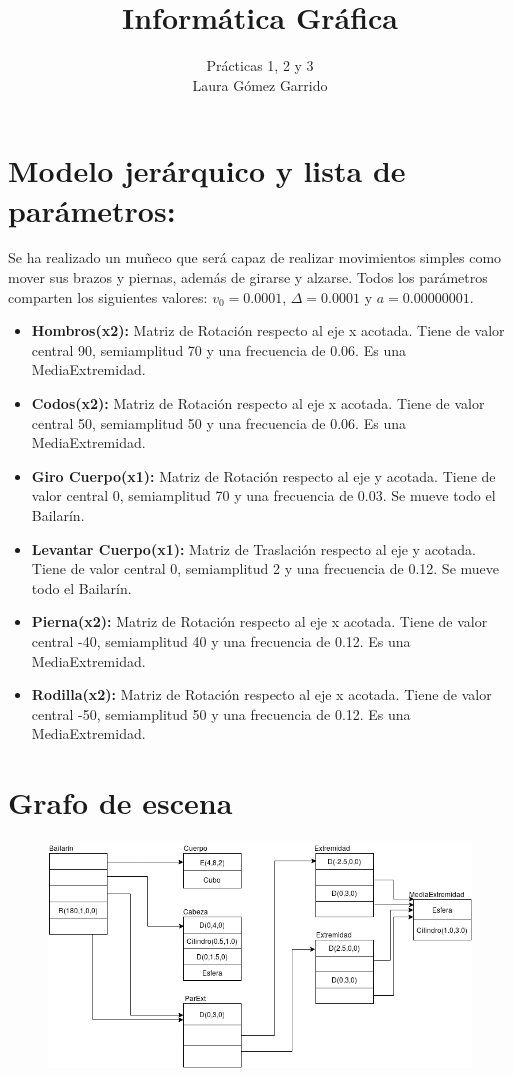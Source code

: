 \documentclass[11pt]{article}
\title{\textbf{Informática Gráfica}}
\author{Prácticas 1, 2 y 3\\
		Laura Gómez Garrido}
\date{}
\begin{document}
\maketitle

\section{Modelo jerárquico y lista de parámetros:}

Se ha realizado un muñeco que será capaz de realizar movimientos simples como mover sus brazos y piernas, además de girarse y alzarse. Todos los parámetros comparten los siguientes valores: $v_0=0.0001$, $\Delta=0.0001$ y $a=0.00000001$.
\begin{itemize}
\item \textbf{Hombros(x2):} Matriz de Rotación respecto al eje x acotada. Tiene de valor central 90, semiamplitud 70 y una frecuencia de 0.06. Es una MediaExtremidad.
\item \textbf{Codos(x2):} Matriz de Rotación respecto al eje x acotada. Tiene de valor central 50, semiamplitud 50 y una frecuencia de 0.06. Es una MediaExtremidad.
\item \textbf{Giro Cuerpo(x1):} Matriz de Rotación respecto al eje y acotada. Tiene de valor central 0, semiamplitud 70 y una frecuencia de 0.03. Se mueve todo el Bailarín.
\item \textbf{Levantar Cuerpo(x1):} Matriz de Traslación respecto al eje y acotada. Tiene de valor central 0, semiamplitud 2 y una frecuencia de 0.12. Se mueve todo el Bailarín.
\item \textbf{Pierna(x2):} Matriz de Rotación respecto al eje x acotada. Tiene de valor central -40, semiamplitud 40 y una frecuencia de 0.12. Es una MediaExtremidad.
\item \textbf{Rodilla(x2):} Matriz de Rotación respecto al eje x acotada. Tiene de valor central -50, semiamplitud 50 y una frecuencia de 0.12. Es una MediaExtremidad.
\end{itemize}

\newpage

\section{Grafo de escena}
\begin{center}
	\begin{figure}[h]
		\includegraphics[scale=0.6]{GrafoEscena}
	\end{figure}
\end{center}
\end{document}
